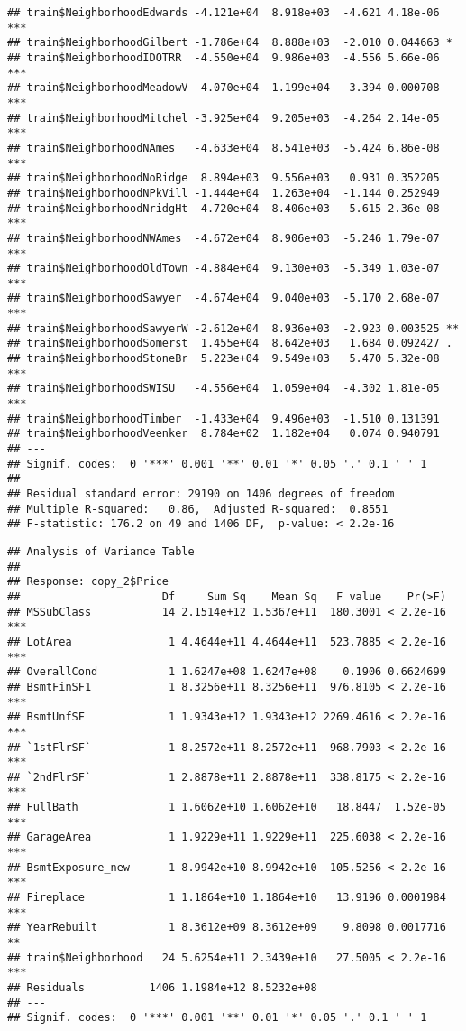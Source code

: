 \documentclass[]{article}
\begin{document}
\begin{verbatim}
## train$NeighborhoodEdwards -4.121e+04  8.918e+03  -4.621 4.18e-06 ***
## train$NeighborhoodGilbert -1.786e+04  8.888e+03  -2.010 0.044663 *  
## train$NeighborhoodIDOTRR  -4.550e+04  9.986e+03  -4.556 5.66e-06 ***
## train$NeighborhoodMeadowV -4.070e+04  1.199e+04  -3.394 0.000708 ***
## train$NeighborhoodMitchel -3.925e+04  9.205e+03  -4.264 2.14e-05 ***
## train$NeighborhoodNAmes   -4.633e+04  8.541e+03  -5.424 6.86e-08 ***
## train$NeighborhoodNoRidge  8.894e+03  9.556e+03   0.931 0.352205    
## train$NeighborhoodNPkVill -1.444e+04  1.263e+04  -1.144 0.252949    
## train$NeighborhoodNridgHt  4.720e+04  8.406e+03   5.615 2.36e-08 ***
## train$NeighborhoodNWAmes  -4.672e+04  8.906e+03  -5.246 1.79e-07 ***
## train$NeighborhoodOldTown -4.884e+04  9.130e+03  -5.349 1.03e-07 ***
## train$NeighborhoodSawyer  -4.674e+04  9.040e+03  -5.170 2.68e-07 ***
## train$NeighborhoodSawyerW -2.612e+04  8.936e+03  -2.923 0.003525 ** 
## train$NeighborhoodSomerst  1.455e+04  8.642e+03   1.684 0.092427 .  
## train$NeighborhoodStoneBr  5.223e+04  9.549e+03   5.470 5.32e-08 ***
## train$NeighborhoodSWISU   -4.556e+04  1.059e+04  -4.302 1.81e-05 ***
## train$NeighborhoodTimber  -1.433e+04  9.496e+03  -1.510 0.131391    
## train$NeighborhoodVeenker  8.784e+02  1.182e+04   0.074 0.940791    
## ---
## Signif. codes:  0 '***' 0.001 '**' 0.01 '*' 0.05 '.' 0.1 ' ' 1
## 
## Residual standard error: 29190 on 1406 degrees of freedom
## Multiple R-squared:   0.86,  Adjusted R-squared:  0.8551 
## F-statistic: 176.2 on 49 and 1406 DF,  p-value: < 2.2e-16
\end{verbatim}

\begin{verbatim}
## Analysis of Variance Table
## 
## Response: copy_2$Price
##                      Df     Sum Sq    Mean Sq   F value    Pr(>F)    
## MSSubClass           14 2.1514e+12 1.5367e+11  180.3001 < 2.2e-16 ***
## LotArea               1 4.4644e+11 4.4644e+11  523.7885 < 2.2e-16 ***
## OverallCond           1 1.6247e+08 1.6247e+08    0.1906 0.6624699    
## BsmtFinSF1            1 8.3256e+11 8.3256e+11  976.8105 < 2.2e-16 ***
## BsmtUnfSF             1 1.9343e+12 1.9343e+12 2269.4616 < 2.2e-16 ***
## `1stFlrSF`            1 8.2572e+11 8.2572e+11  968.7903 < 2.2e-16 ***
## `2ndFlrSF`            1 2.8878e+11 2.8878e+11  338.8175 < 2.2e-16 ***
## FullBath              1 1.6062e+10 1.6062e+10   18.8447  1.52e-05 ***
## GarageArea            1 1.9229e+11 1.9229e+11  225.6038 < 2.2e-16 ***
## BsmtExposure_new      1 8.9942e+10 8.9942e+10  105.5256 < 2.2e-16 ***
## Fireplace             1 1.1864e+10 1.1864e+10   13.9196 0.0001984 ***
## YearRebuilt           1 8.3612e+09 8.3612e+09    9.8098 0.0017716 ** 
## train$Neighborhood   24 5.6254e+11 2.3439e+10   27.5005 < 2.2e-16 ***
## Residuals          1406 1.1984e+12 8.5232e+08                        
## ---
## Signif. codes:  0 '***' 0.001 '**' 0.01 '*' 0.05 '.' 0.1 ' ' 1
\end{verbatim}
\end{document}
